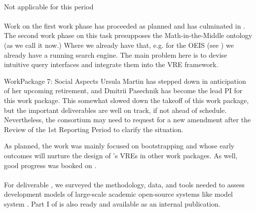 \documentclass{deliverablereport}
\makeatletter
\renewcommand\subsubsection{\@startsection{subsubsection}{2}%
  \z@{.5\linespacing\@plus.7\linespacing}{.1\linespacing}%
  {\normalfont\bfseries}}
\makeatother
\begin{document}
  \paragraph{}
  Not applicable for this period
  
  \paragraph{}
  Work on the first work phase has proceeded as planned and has culminated in
  . The second work phase on this task presupposes the
  Math-in-the-Middle ontology (as we call it now.) Where we already have that, e.g. for
  the OEIS (see ) we already have a running search
  engine. The main problem here is to devise intuitive query interfaces and integrate them
  into the \pn VRE framework.

\clearpage
  \subsubsection{WorkPackage 7: Social Aspects}
  Ursula Martin has stepped down in anticipation of her upcoming retirement, and Dmitrii
  Pasechnik has become the lead PI for this work package.  This somewhat slowed down the
  takeoff of this work package, but the important deliverables are well on track, if not
  ahead of schedule. Nevertheless, the consortium may need to request for a new amendment
  after the Review of the 1st Reporting Period to clarify the situation.

  As planned, the work was mainly focused on bootstrapping
   and
   whose early outcomes will nurture
  the design of \ODK's VREs in other work packages. As well, good progress was booked
  on  .

  \paragraph{} %
  For deliverable ,
  we surveyed the methodology, data, and tools needed to assess
  development models of large-scale academic open-source systems
  like model system \Sage.
  Part I of  is also ready and available
  as an internal publication.
\end{document}

